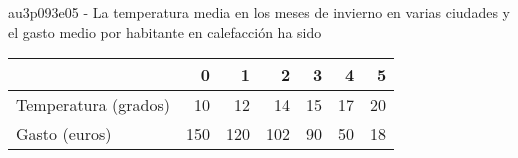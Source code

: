 \documentclass[spanish, 11pt]{exam}
\begin{document}
\begin{questions}
\begin{multicols}{1}
\begin{parts}
        \end{parts}
        \end{multicols}
        \question au3p093e05 - La temperatura media en los meses de invierno en varias ciudades y el gasto medio por habitante en
calefacción ha sido\\\begin{tabular}{lrrrrrr}
\hline
                      &   0 &   1 &   2 &   3 &   4 &   5 \\
\hline
 Temperatura (grados) &  10 &  12 &  14 &  15 &  17 &  20 \\
 Gasto (euros)        & 150 & 120 & 102 &  90 &  50 &  18 \\
\hline
\end{tabular}
        \begin{multicols}{1}
\end{multicols}
\end{questions}
\end{document}
